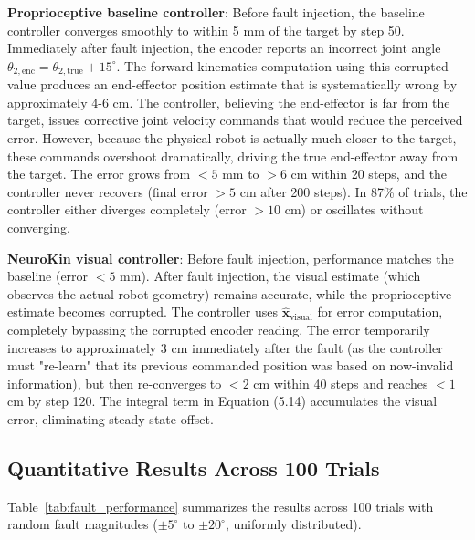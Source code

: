 ﻿\documentclass[12pt,a4paper,oneside]{report}
\begin{document}
\textbf{Proprioceptive baseline controller}: Before fault injection, the baseline controller converges smoothly to within 5 mm of the target by step 50. Immediately after fault injection, the encoder reports an incorrect joint angle $\theta_{2,\text{enc}} = \theta_{2,\text{true}} + 15^\circ$. The forward kinematics computation using this corrupted value produces an end-effector position estimate that is systematically wrong by approximately 4-6 cm. The controller, believing the end-effector is far from the target, issues corrective joint velocity commands that would reduce the perceived error. However, because the physical robot is actually much closer to the target, these commands overshoot dramatically, driving the true end-effector away from the target. The error grows from $<5$ mm to $>6$ cm within 20 steps, and the controller never recovers (final error $>5$ cm after 200 steps). In 87\% of trials, the controller either diverges completely (error $>10$ cm) or oscillates without converging.

\textbf{NeuroKin visual controller}: Before fault injection, performance matches the baseline (error $<5$ mm). After fault injection, the visual estimate (which observes the actual robot geometry) remains accurate, while the proprioceptive estimate becomes corrupted. The controller uses $\hat{\mathbf{x}}_{\text{visual}}$ for error computation, completely bypassing the corrupted encoder reading. The error temporarily increases to approximately 3 cm immediately after the fault (as the controller must "re-learn" that its previous commanded position was based on now-invalid information), but then re-converges to $<2$ cm within 40 steps and reaches $<1$ cm by step 120. The integral term in Equation (5.14) accumulates the visual error, eliminating steady-state offset.

\subsection{Quantitative Results Across 100 Trials}

Table~\ref{tab:fault_performance} summarizes the results across 100 trials with random fault magnitudes ($\pm5^\circ$ to $\pm20^\circ$, uniformly distributed).

\begin{table}[H]
\centering
\caption{Fault-tolerant performance comparison (100 trials, random fault magnitude $\pm5^\circ$ to $\pm20^\circ$).}
\label{tab:fault_performance}
\end{table}
\end{document}
